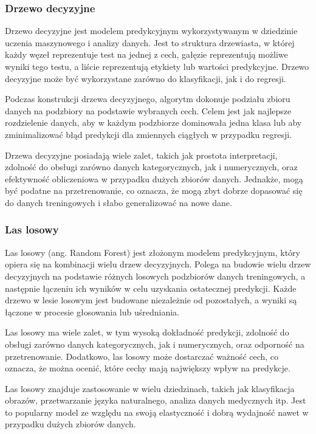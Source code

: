 \documentclass{article}
\begin{document}
\subsubsection{Drzewo decyzyjne}
Drzewo decyzyjne jest modelem predykcyjnym wykorzystywanym w 
dziedzinie uczenia maszynowego i analizy danych. Jest to 
struktura drzewiasta, w której każdy węzeł reprezentuje 
test na jednej z cech, gałęzie reprezentują możliwe wyniki 
tego testu, a liście reprezentują etykiety lub wartości 
predykcyjne. Drzewo decyzyjne może być wykorzystane 
zarówno do klasyfikacji, jak i do regresji.

Podczas konstrukcji drzewa decyzyjnego, 
algorytm dokonuje podziału zbioru danych 
na podzbiory na podstawie wybranych cech. 
Celem jest jak najlepsze rozdzielenie danych, 
aby w każdym podzbiorze dominowała jedna klasa 
lub aby zminimalizować błąd predykcji dla zmiennych 
ciągłych w przypadku regresji.

Drzewa decyzyjne posiadają wiele zalet, takich jak 
prostota interpretacji, zdolność do obsługi zarówno 
danych kategorycznych, jak i numerycznych, oraz efektywność 
obliczeniowa w przypadku dużych zbiorów danych. Jednakże, 
mogą być podatne na przetrenowanie, co oznacza, że mogą zbyt 
dobrze dopasować się do danych treningowych i słabo generalizować na nowe dane.

\subsubsection{Las losowy}
Las losowy (ang. Random Forest) jest złożonym modelem 
predykcyjnym, który opiera się na kombinacji wielu drzew decyzyjnych. 
Polega na budowie wielu drzew decyzyjnych na podstawie 
różnych losowych podzbiorów danych treningowych, a 
następnie łączeniu ich wyników w celu uzyskania ostatecznej 
predykcji. Każde drzewo w lesie losowym jest budowane 
niezależnie od pozostałych, a wyniki są łączone w procesie 
głosowania lub uśredniania.

Las losowy ma wiele zalet, w tym wysoką dokładność 
predykcji, zdolność do obsługi zarówno danych 
kategorycznych, jak i numerycznych, oraz odporność 
na przetrenowanie. Dodatkowo, las losowy może dostarczać 
ważność cech, co oznacza, że można ocenić, które cechy 
mają największy wpływ na predykcje.

Las losowy znajduje zastosowanie w wielu dziedzinach, 
takich jak klasyfikacja obrazów, przetwarzanie 
języka naturalnego, analiza danych medycznych itp. 
Jest to popularny model ze względu na swoją elastyczność 
i dobrą wydajność nawet w przypadku dużych zbiorów danych.
\end{document}
